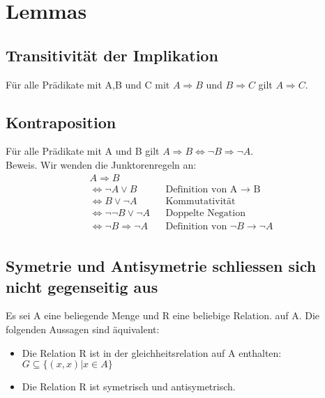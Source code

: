 \section{Lemmas}
\subsection{Transitivität der Implikation}
Für alle Prädikate mit A,B und C mit \(A \Rightarrow B\) und \(B \Rightarrow C\) gilt \(A \Rightarrow C\).
\subsection{Kontraposition}
Für alle Prädikate mit A und B gilt \(A \Rightarrow B \Leftrightarrow \neg B \Rightarrow \neg A\).\\
Beweis. Wir wenden die Junktorenregeln an:\\
\begin{align*}
    A \Rightarrow B \\
    \Leftrightarrow \neg A \vee B && \text{Definition von A $\rightarrow$ B}\\
    \Leftrightarrow B \vee \neg A && \text{Kommutativität}\\
    \Leftrightarrow \neg\neg B \vee \neg A && \text{Doppelte Negation}\\
    \Leftrightarrow \neg B \Rightarrow \neg A && \text{Definition von $\neg B \rightarrow \neg A$}\\
\end{align*}
\subsection{Symetrie und Antisymetrie schliessen sich nicht gegenseitig aus}
Es sei A eine beliegende Menge und R eine beliebige Relation. auf A. Die folgenden Aussagen sind äquivalent:\\
\begin{itemize}
    \item Die Relation R ist in der gleichheitsrelation auf A enthalten: \(G \subseteq \{(x,x)|x \in A\}\)
    \item Die Relation R ist symetrisch und antisymetrisch.
\end{itemize}